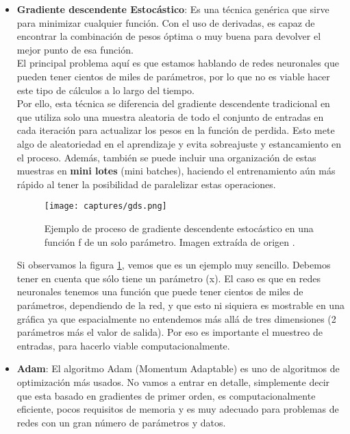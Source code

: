 \documentclass[11pt,fleqn]{book} %
\begin{document}
\begin{itemize}
	\item \textbf{Gradiente descendente Estocástico}: Es una técnica genérica que sirve para minimizar cualquier función. Con el uso de derivadas, es capaz de encontrar la combinación de pesos óptima o muy buena para devolver el mejor punto de esa función. \\
	
	El principal problema aquí es que estamos hablando de redes neuronales que pueden tener cientos de miles de parámetros, por lo que no es viable hacer este tipo de cálculos a lo largo del tiempo. \\
	
	Por ello, esta técnica se diferencia del gradiente descendente tradicional en que utiliza solo una muestra aleatoria de todo el conjunto de entradas en cada iteración para actualizar los pesos en la función de perdida. Esto mete algo de aleatoriedad en el aprendizaje y evita sobreajuste y estancamiento en el proceso. Además, también se puede incluir una organización de estas muestras en \textbf{mini lotes} (mini batches), haciendo el entrenamiento aún más rápido al tener la posibilidad de paralelizar estas operaciones.
	
	\begin{figure}[H]
		\centering\texttt{[image: captures/gds.png]}
		\caption{Ejemplo de proceso de gradiente descendente estocástico en una función f de un solo parámetro. Imagen extraída de origen \cite{article:ejemploGDS}.}
		\label{fig:GDS} %
	\end{figure}

	Si observamos la figura \ref{fig:GDS}, vemos que es un ejemplo muy sencillo. Debemos tener en cuenta que sólo tiene un parámetro (x). El caso es que en redes neuronales tenemos una función que puede tener cientos de miles de parámetros, dependiendo de la red, y que esto ni siquiera es mostrable en una gráfica ya que espacialmente no entendemos más allá de tres dimensiones (2 parámetros más el valor de salida). Por eso es importante el muestreo de entradas, para hacerlo viable computacionalmente. \\

	\item \textbf{Adam}: El algoritmo Adam (Momentum Adaptable) es uno de algoritmos de optimización más usados. No vamos a entrar en detalle, simplemente decir que esta basado en gradientes de primer orden, es computacionalmente eficiente, pocos requisitos de memoria y es muy adecuado para problemas de redes con un gran número de parámetros y datos.  \\
\end{itemize}
\end{document}
